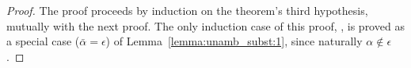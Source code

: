 \begin{proof}
The proof proceeds by induction on the theorem's third hypothesis, mutually with the next proof.
The only induction case of this proof, , is proved as a special case
($\bar{\alpha} = \epsilon$) of Lemma~\ref{lemma:unamb_subst:1}, since naturally
$\alpha\notin\epsilon$.
\end{proof}

